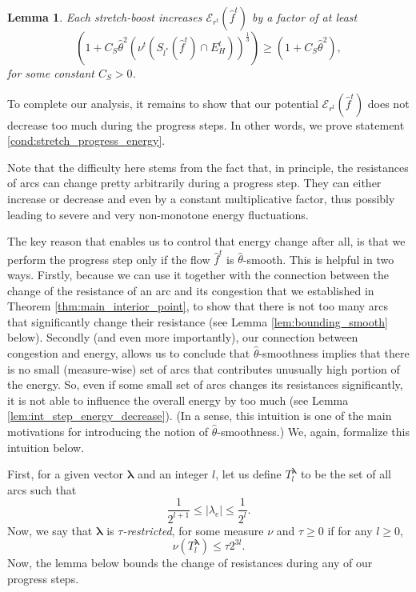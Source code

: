 \documentclass[11pt, letterpaper]{article}
\newtheorem{lemma}[theorem]{Lemma}
\newcommand{\cincrease}{C_{S}}
\newcommand{\energy}[2]{\mathcal{E}_{#1}(#2)}
\newcommand{\Cset}[2]{S_{#1}(#2)}
\newcommand{\htheta}{\hat{\theta}}
\newcommand{\vnu}{\boldsymbol{\mathit{\nu}}}
\newcommand{\vlambda}{\boldsymbol{\lambda}}
\newcommand{\hff}{\boldsymbol{\mathit{\hat{f}}}}
\newcommand{\rr}{\boldsymbol{\mathit{r}}}
\begin{document}
\begin{lemma}
\label{lem:stretch_boosting_energy_increase}
Each stretch-boost increases $\energy{\rr^t}{\hff^t}$ by a factor of at least 
\[
\left(1+\cincrease\htheta^{2}\left(\vnu^t(\Cset{l^*}{\hff^t}\cap E_{H}^t)\right)^{\frac{1}{3}}\right)\geq \left(1+\cincrease\htheta^{2}\right),
\]
for some constant $\cincrease>0$.
\end{lemma}

To complete our analysis, it remains to show that our potential $\energy{\rr^t}{\hff^t}$ does not decrease too much during the progress steps. In other words, we prove statement \eqref{cond:stretch_progress_energy}. 

Note that the difficulty here stems from the fact that, in principle, the resistances of arcs can change pretty arbitrarily during a progress step. They can either increase or decrease and even by a constant multiplicative factor, thus possibly leading to severe and very non-monotone energy fluctuations. 

The key reason that enables us to control that energy change after all, is that we perform the progress step only if the flow $\hff^t$ is $\htheta$-smooth. This is helpful in two ways. Firstly, because we can use it together with the connection between the change of the resistance of an arc and its congestion that we established in Theorem \ref{thm:main_interior_point}, to show that there is not too many arcs that significantly change their resistance (see Lemma \ref{lem:bounding_smooth} below). Secondly (and even more importantly), our connection between congestion and energy, allows us to conclude that $\htheta$-smoothness implies that there is no small (measure-wise) set of arcs that contributes unusually high portion of the energy. So, even if some small set of arcs changes its resistances significantly, it is not able to influence the overall energy by too much (see Lemma \ref{lem:int_step_energy_decrease}). (In a sense, this intuition is one of the main motivations for introducing the notion of $\htheta$-smoothness.) We, again, formalize this intuition below. 

First, for a given vector $\vlambda$ and an integer $l$, let us define $T_l^{\vlambda}$ to be the set of all arcs such that
\begin{equation}\label{eq:def_t_lambda}
\frac{1}{2^{l+1}}\leq |\lambda_e|\leq \frac{1}{2^l}.
\end{equation}
Now, we say that $\vlambda$ is {\em $\tau$-restricted}, for some measure $\vnu$ and $\tau\geq 0$ if for any $l\geq 0$, 
\begin{equation}\label{eq:def_tau_restricted}
\vnu(T_l^{\vlambda}) \leq \tau 2^{3l}.
\end{equation}
Now, the lemma below bounds the change of resistances during any of our progress steps. 
\end{document}
